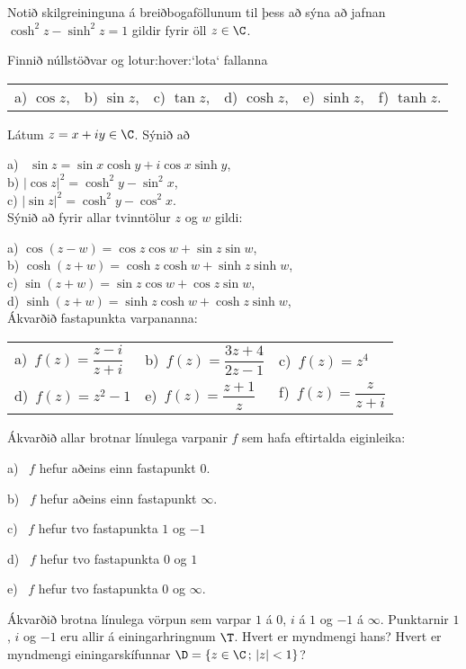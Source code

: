 \daemi Notið skilgreininguna á breiðbogaföllunum til þess að sýna
að  jafnan $\cosh^2 z-\sinh^2 z=1$ gildir fyrir öll $z\in \C$.


\daemi Finnið núllstöðvar og lotur:hover:`lota` fallanna

\smallskip\noindent
\begin{tabular}{llllll}
 a) $\cos z$, 
&b) $\sin z$,
&c) $\tan z$,
&d) $\cosh z$, 
&e) $\sinh z$,
&f) $\tanh z$.\\
\end{tabular}

\daemi Látum $z=x+iy\in \C$.  Sýnið  að

\smallskip\noindent
a)  \ $\sin z=\sin x\cosh y+i\cos x \sinh y$,\\
b) $|\cos z|^2=\cosh^2y-\sin^2 x$,\\
c)  $|\sin z|^2=\cosh^2y-\cos^2 x$.\\



\daemi Sýnið að fyrir allar tvinntölur $z$ og $w$ gildi:

\smallskip\noindent
a)  $\cos(z-w)=\cos z\cos w+\sin z \sin w$,\\
b)  $\cosh(z+w)=\cosh z\cosh w+\sinh z \sinh w$,\\
c)  $\sin(z+w)=\sin z\cos w+\cos z \sin w$,\\
d)  $\sinh(z+w)=\sinh z\cosh w+\cosh z \sinh w$,\\


\daemi Ákvarðið fastapunkta varpananna:

\smallskip
\begin{tabular}{lll}
a)\ $f(z)=\dfrac{z-i}{z+i}$  &
b)\ $f(z)=\dfrac{3z+4}{2z-1}$  &
c)\ $f(z)=z^4$  \\
d)\ $f(z)=z^2-1$&
e)\ $f(z)=\dfrac{z+1}{z}$  &
f)\ $f(z)=\dfrac{z}{z+i}$
\end{tabular}


\daemi Ákvarðið allar brotnar línulega varpanir $f$ sem hafa eftirtalda
eiginleika:

\smallskip
a) \ $f$ hefur aðeins einn fastapunkt $0$.

\smallskip
b) \ $f$ hefur aðeins einn fastapunkt $\infty$.

\smallskip
c) \ $f$ hefur tvo fastapunkta $1$ og $-1$

\smallskip
d) \ $f$ hefur tvo fastapunkta $0$ og $1$

\smallskip
e) \ $f$ hefur tvo fastapunkta $0$ og $\infty$.

\daemi  Ákvarðið brotna línulega vörpun  sem varpar $1$ á $0$,
$i$ á $1$ og $-1$ á $\infty$.  Punktarnir $1$, $i$ og $-1$ eru allir á
einingarhringnum $\T$.  Hvert er myndmengi hans?  Hvert er myndmengi 
einingarskífunnar $\D=\{z\in \C\,;\, |z|<1\}$?

